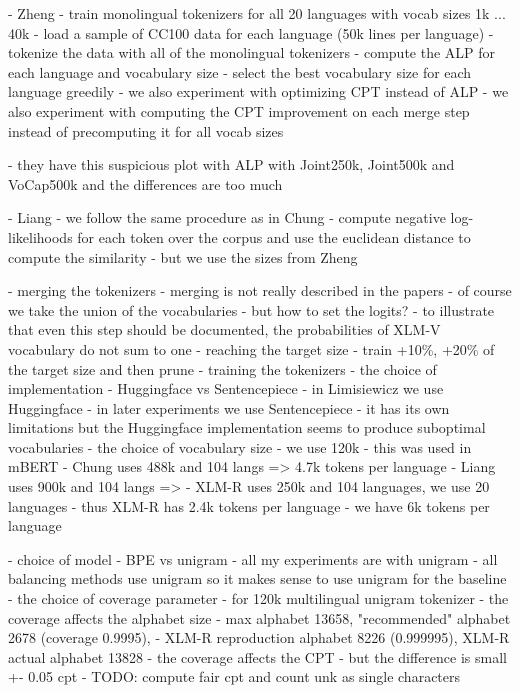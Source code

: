     - Zheng
        - train monolingual tokenizers for all 20 languages with vocab sizes 1k ... 40k
        - load a sample of CC100 data for each language (50k lines per language)
        - tokenize the data with all of the monolingual tokenizers
        - compute the ALP for each language and vocabulary size
        - select the best vocabulary size for each language greedily
        - we also experiment with optimizing CPT instead of ALP
        - we also experiment with computing the CPT improvement on each merge step instead of precomputing it for all vocab sizes

        - they have this suspicious plot with ALP with Joint250k, Joint500k and VoCap500k and the differences are too much

    - Liang
        - we follow the same procedure as in Chung
        - compute negative log-likelihoods for each token over the corpus and use the euclidean distance to compute the similarity
        - but we use the sizes from Zheng

    - merging the tokenizers
        - merging is not really described in the papers
        - of course we take the union of the vocabularies
        - but how to set the logits?
            - to illustrate that even this step should be documented, the probabilities of XLM-V vocabulary do not sum to one
    - reaching the target size
        - train +10\%, +20\% of the target size and then prune
- training the tokenizers
    - the choice of implementation
        - Huggingface vs Sentencepiece
            - in Limisiewicz we use Huggingface
            - in later experiments we use Sentencepiece
                - it has its own limitations but the Huggingface implementation seems to produce suboptimal vocabularies
    - the choice of vocabulary size
        - we use 120k
        - this was used in mBERT
        - Chung uses 488k and 104 langs => 4.7k tokens per language
        - Liang uses 900k and 104 langs => 
        - XLM-R uses 250k and 104 languages, we use 20 languages
            - thus XLM-R has 2.4k tokens per language
            - we have 6k tokens per language

    - choice of model - BPE vs unigram
        - all my experiments are with unigram
        - all balancing methods use unigram so it makes sense to use unigram for the baseline
    - the choice of coverage parameter
        - for 120k multilingual unigram tokenizer
            - the coverage affects the alphabet size 
                - max alphabet 13658, "recommended" alphabet 2678 (coverage 0.9995), 
                - XLM-R reproduction alphabet 8226 (0.999995), XLM-R actual alphabet 13828
            - the coverage affects the CPT
                - but the difference is small +- 0.05 cpt
                - TODO: compute fair cpt and count unk as single characters



